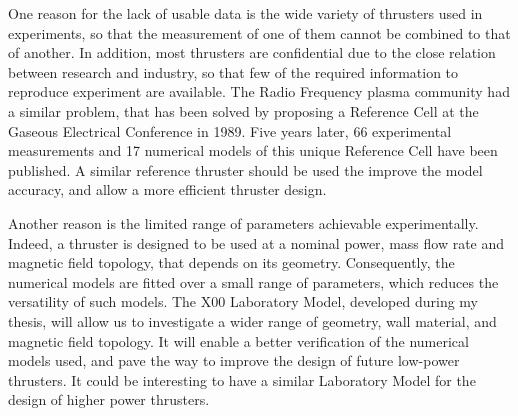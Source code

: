     One reason for the lack of usable data is the wide variety of thrusters used in experiments, so that the measurement of one of them cannot be combined to that of another.
    In addition, most thrusters are confidential due to the close relation between research and industry, so that few of the required information to reproduce experiment are available.
    The Radio Frequency plasma community had a similar problem, that has been solved by proposing a Reference Cell at the Gaseous Electrical Conference in 1989\citep{olthoff1995}.
    Five years later, 66 experimental measurements and 17 numerical models of this unique Reference Cell have been published.
    A similar reference thruster should be used the improve the model accuracy, and allow a more efficient thruster design.

    Another reason is the limited range of parameters achievable experimentally.
    Indeed, a thruster is designed to be used at a nominal power, mass flow rate and magnetic field topology, that depends on its geometry.
    Consequently, the numerical models are fitted over a small range of parameters, which reduces the versatility of such models.
    The \PPS X00 Laboratory Model, developed during my thesis, will allow us to investigate a wider range of geometry, wall material, and magnetic field topology.
    It will enable a better verification of the numerical models used, and pave the way to improve the design of future low-power thrusters.
    It could be interesting to have a similar Laboratory Model for the design of higher power thrusters. 



% 
% 
% 
% 
% 
% 
% 
% 
% 
% 
% 
% 
